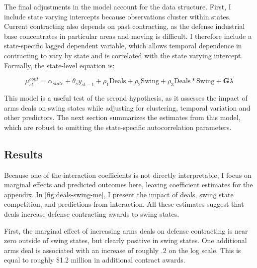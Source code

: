 \documentclass[12pt]{article}
\begin{document}
The final adjustments in the model account for the data structure.
First, I include state varying intercepts because observations cluster within states. 
Current contracting also depends on past contracting, as the defense industrial base concentrates in particular areas and moving is difficult. 
I therefore include a state-specific lagged dependent variable, which allows temporal dependence in contracting to vary by state and is correlated with the state varying intercept.\citep{See the appendix for descriptive evidence that temporal dependence in contracting varies by state and the state-level autoregressive parameters.}
Formally, the state-level equation is: 

\begin{equation}
\mu_{st}^{cont} = \alpha_{state} + \theta_s y_{st-1} + \rho_1 \mbox{Deals} + \rho_2 \mbox{Swing} + \rho_3 \mbox{Deals} * \mbox{Swing} + \textbf{G} \lambda
\end{equation}


This model is a useful test of the second hypothesis, as it assesses the impact of arms deals on swing states while adjusting for clustering, temporal variation and other predictors.%
The next section summarizes the estimates from this model, which are robust to omitting the state-specific autocorrelation parameters. 


\subsection{Results}


Because one of the interaction coefficients is not directly interpretable, I focus on marginal effects and predicted outcomes here, leaving coefficient estimates for the appendix.
In \autoref{fig:deals-swing-me}, I present the impact of deals, swing state competition, and predictions from interaction.
All these estimates suggest that deals increase defense contracting awards to swing states. 


First, the marginal effect of increasing arms deals on defense contracting is near zero outside of swing states, but clearly positive in swing states. 
One additional arms deal is associated with an increase of roughly .2 on the log scale.
This is equal to roughly \$1.2 million in additional contract awards. 
\end{document}
